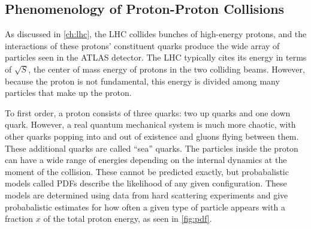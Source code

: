 


\subsection{Phenomenology of Proton-Proton Collisions}
\label{sec:pp_collisions}

As discussed in \autoref{ch:lhc}, the \ac{LHC} collides bunches of high-energy protons, and the interactions of these protons' constituent quarks produce the wide array of particles seen in the ATLAS detector. The \ac{LHC} typically cites its energy in terms of $\sqrt{S}$, the center of mass energy of protons in the two colliding beams. However, because the proton is not fundamental, this energy is divided among many particles that make up the proton. 

To first order, a proton consists of three quarks: two up quarks and one down quark. However, a real quantum mechanical system is much more chaotic, with other quarks popping into and out of existence and gluons flying between them. These additional quarks are called ``sea'' quarks. The particles inside the proton can have a wide range of energies depending on the internal dynamics at the moment of the collision. These cannot be predicted exactly, but probabalistic models called \acp{PDF} describe the likelihood of any given configuration. These models are determined using data from hard scattering experiments and give probabalistic estimates for how often a given type of particle appears with a fraction $x$ of the total proton energy, as seen in \autoref{fig:pdf}. 

